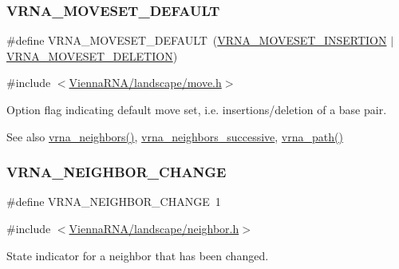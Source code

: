 \subsubsection{\texorpdfstring{VRNA\_MOVESET\_DEFAULT}{VRNA\_MOVESET\_DEFAULT}}
{\footnotesize\ttfamily \#define V\+R\+N\+A\+\_\+\+M\+O\+V\+E\+S\+E\+T\+\_\+\+D\+E\+F\+A\+U\+LT~(\mbox{\hyperlink{group__neighbors_gaf39028db9c70d3be528929182a3f2d5a}{V\+R\+N\+A\+\_\+\+M\+O\+V\+E\+S\+E\+T\+\_\+\+I\+N\+S\+E\+R\+T\+I\+ON}} $\vert$ \mbox{\hyperlink{group__neighbors_gac05db9392c6647e3e9a6982096c5b384}{V\+R\+N\+A\+\_\+\+M\+O\+V\+E\+S\+E\+T\+\_\+\+D\+E\+L\+E\+T\+I\+ON}})}



{\ttfamily \#include $<$\mbox{\hyperlink{move_8h}{Vienna\+R\+N\+A/landscape/move.\+h}}$>$}



Option flag indicating default move set, i.\+e. insertions/deletion of a base pair. 

\begin{DoxySeeAlso}{See also}
\mbox{\hyperlink{group__neighbors_ga4f8eefae08c05f5a49a4d4ee5d02e32f}{vrna\+\_\+neighbors()}}, \mbox{\hyperlink{group__neighbors_gae5aaa1c5a1f22e889843f3edbdd04714}{vrna\+\_\+neighbors\+\_\+successive}}, \mbox{\hyperlink{group__paths__walk_gaef7afadc36933b80706de49fe36e7b94}{vrna\+\_\+path()}} 
\end{DoxySeeAlso}
\mbox{\label{group__neighbors_gae72b0e349b6108c00737df51cce44622}} 
\subsubsection{\texorpdfstring{VRNA\_NEIGHBOR\_CHANGE}{VRNA\_NEIGHBOR\_CHANGE}}
{\footnotesize\ttfamily \#define V\+R\+N\+A\+\_\+\+N\+E\+I\+G\+H\+B\+O\+R\+\_\+\+C\+H\+A\+N\+GE~1}



{\ttfamily \#include $<$\mbox{\hyperlink{landscape_2neighbor_8h}{Vienna\+R\+N\+A/landscape/neighbor.\+h}}$>$}



State indicator for a neighbor that has been changed. 

